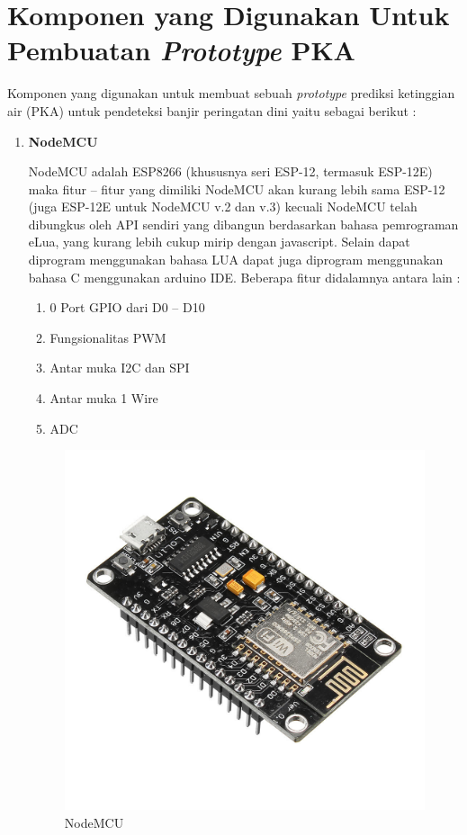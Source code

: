 \section{Komponen yang Digunakan Untuk Pembuatan \textit{Prototype} PKA}
Komponen yang digunakan untuk membuat sebuah \textit{prototype} prediksi ketinggian air (PKA) untuk pendeteksi banjir peringatan dini yaitu sebagai berikut :
\begin{enumerate}
    \item \textbf{NodeMCU}
   \par  NodeMCU adalah ESP8266 (khususnya seri ESP-12, termasuk ESP-12E) maka fitur – fitur yang dimiliki NodeMCU akan kurang lebih sama ESP-12 (juga ESP-12E untuk NodeMCU v.2 dan v.3) kecuali NodeMCU telah dibungkus oleh API sendiri yang dibangun berdasarkan bahasa pemrograman eLua, yang kurang lebih cukup mirip dengan javascript. Selain dapat diprogram menggunakan bahasa LUA dapat juga diprogram menggunakan bahasa C menggunakan arduino IDE. Beberapa fitur didalamnya antara lain : 
    \begin{enumerate}
        \item 0 Port GPIO dari D0 – D10
        \item Fungsionalitas PWM
        \item Antar muka I2C dan SPI
        \item Antar muka 1 Wire
        \item ADC
    \end{enumerate}
    
    \begin{figure}[H]
\centering
\includegraphics[width=1\textwidth]{figures/node.jpg}
\caption{NodeMCU}
\label{print}
\end{figure}


\end{enumerate}
